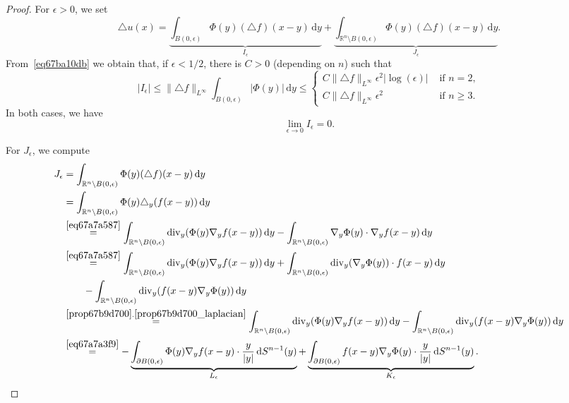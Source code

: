 \documentclass[a4paper,9pt]{amsart}
\newcommand{\R}{\mathbb{R}}	%
\newcommand{\did}{\,\mathrm{d}}	%
\newcommand{\de}{\partial}		%
\renewcommand{\div}{\operatorname{div}}	%
\newcommand{\laplacian}{\triangle}
\newcommand{\grad}{\nabla}
\theoremstyle{plain}
\theoremstyle{definition}
\theoremstyle{remark}
\begin{document}
\begin{proof}
	For $\epsilon>0$, we set
	\[
	\laplacian u(x) = \underbrace{ \int_{B(0,\epsilon)} \Phi(y) (\laplacian f)(x-y) \did y }_{I_\epsilon}
		+ \underbrace{ \int_{\R^n\setminus B(0,\epsilon)} \Phi(y) (\laplacian f)(x-y) \did y }_{J_\epsilon} .
	\]
	From~\eqref{eq67ba10db} we obtain that, if $\epsilon<1/2$, there is $C>0$ (depending on $n$) such that 
	\[
	|I_\epsilon| 
	\le \|\laplacian f\|_{L^\infty} \int_{B(0,\epsilon)} |\Phi(y)| \did y 
	\le \begin{cases}
	C \|\laplacian f\|_{L^\infty} \epsilon^2 |\log(\epsilon)| & \text{ if }n=2 , \\
	C \|\laplacian f\|_{L^\infty} \epsilon^2 & \text{ if }n\ge3 .
	\end{cases}
	\]
	In both cases, we have 
	\begin{equation}\label{eq67ba10b2}
		\lim_{\epsilon\to0}I_\epsilon = 0 .
	\end{equation}
	
	For $J_\epsilon$, we compute
	\begin{align*}
		J_\epsilon 
		&= \int_{\R^n\setminus B(0,\epsilon)} \Phi(y) (\laplacian f)(x-y) \did y \\
		&= \int_{\R^n\setminus B(0,\epsilon)} \Phi(y) \laplacian_y (f(x-y)) \did y \\
		&\overset{\eqref{eq67a7a587}}= \int_{\R^n\setminus B(0,\epsilon)} \div_y (\Phi(y)  \grad_yf(x-y)) \did y 
			- \int_{\R^n\setminus B(0,\epsilon)} \grad_y\Phi(y) \cdot \grad_y f(x-y) \did y \\
		&\overset{\eqref{eq67a7a587}}= \int_{\R^n\setminus B(0,\epsilon)} \div_y (\Phi(y)  \grad_yf(x-y)) \did y
			+ \int_{\R^n\setminus B(0,\epsilon)} \div_y(\grad_y\Phi(y)) \cdot f(x-y) \did y  \\
		&\qquad
			- \int_{\R^n\setminus B(0,\epsilon)} \div_y(f(x-y) \grad_y\Phi(y) ) \did y \\
		&\overset{\ref{prop67b9d700}.\ref{prop67b9d700_laplacian}}= \int_{\R^n\setminus B(0,\epsilon)} \div_y (\Phi(y)  \grad_yf(x-y)) \did y
			- \int_{\R^n\setminus B(0,\epsilon)} \div_y(f(x-y) \grad_y\Phi(y) ) \did y \\
		&\overset{\eqref{eq67a7a3f9}}= - \underbrace{ \int_{\de B(0,\epsilon)}  \Phi(y)  \grad_yf(x-y) \cdot \frac{y}{|y|} \did S^{n-1}(y) }_{L_\epsilon}
			+ \underbrace{ \int_{\de B(0,\epsilon)} f(x-y) \grad_y\Phi(y)  \cdot \frac{y}{|y|} \did S^{n-1}(y) }_{K_\epsilon} .
	\end{align*}
	

\end{proof}
\end{document}
